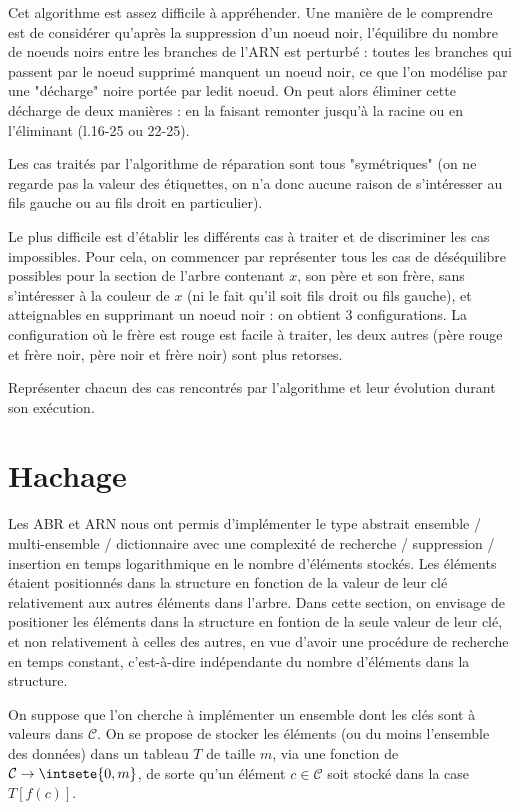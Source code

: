 \documentclass{scrartcl}
\begin{document}
			\rem Cet algorithme est assez difficile à appréhender. Une manière de le comprendre est de considérer qu'après la suppression d'un noeud noir, l'équilibre du nombre de noeuds noirs entre les branches de l'ARN est perturbé : toutes les branches qui passent par le noeud supprimé manquent un noeud noir, ce que l'on modélise par une "décharge" noire portée par ledit noeud.
			On peut alors éliminer cette décharge de deux manières : en la faisant remonter jusqu'à la racine ou en l'éliminant (l.16-25 ou 22-25).

			\rem Les cas traités par l'algorithme de réparation sont tous "symétriques" (on ne regarde pas la valeur des étiquettes, on n'a donc aucune raison de s'intéresser au fils gauche ou au fils droit en particulier).

			\rem Le plus difficile est d'établir les différents cas à traiter et de discriminer les cas impossibles. Pour cela, on commencer par représenter tous les cas de déséquilibre possibles pour la section de l'arbre contenant $x$, son père et son frère, sans s'intéresser à la couleur de $x$ (ni le fait qu'il soit fils droit ou fils gauche), et atteignables en supprimant un noeud noir : on obtient 3 configurations. La configuration où le frère est rouge est facile à traiter, les deux autres (père rouge et frère noir, père noir et frère noir) sont plus retorses.

			\exo Représenter chacun des cas rencontrés par l'algorithme et leur évolution durant son exécution.



	\section{Hachage}
		Les ABR et ARN nous ont permis d'implémenter le type abstrait ensemble / multi-ensemble / dictionnaire avec une complexité de recherche / suppression / insertion en temps logarithmique en le nombre d'éléments stockés. Les éléments étaient positionnés dans la structure en fonction de la valeur de leur clé relativement aux autres éléments dans l'arbre. Dans cette section, on envisage de positioner les éléments dans la structure en fontion de la seule valeur de leur clé, et non relativement à celles des autres, en vue d'avoir une procédure de recherche en temps constant, c'est-à-dire indépendante du nombre d'éléments dans la structure.

		On suppose que l'on cherche à implémenter un ensemble dont les clés sont à valeurs dans $\mathcal{C}$. On se propose de stocker les éléments (ou du moins l'ensemble des données) dans un tableau $T$ de taille $m$, via une fonction de $\mathcal{C} \rightarrow \intsete{0,m}$, de sorte qu'un élément $c \in \mathcal{C}$ soit stocké dans la case $T[f(c)]$.
\end{document}
